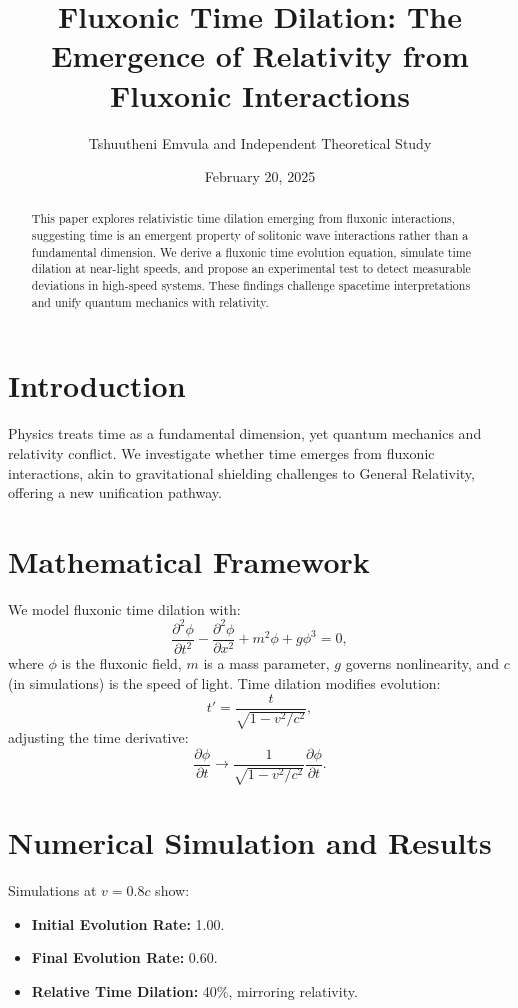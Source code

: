 \documentclass{article}
\title{Fluxonic Time Dilation: The Emergence of Relativity from Fluxonic Interactions}
\author{Tshuutheni Emvula and Independent Theoretical Study}
\date{February 20, 2025}
\begin{document}
\maketitle

\begin{abstract}
This paper explores relativistic time dilation emerging from fluxonic interactions, suggesting time is an emergent property of solitonic wave interactions rather than a fundamental dimension. We derive a fluxonic time evolution equation, simulate time dilation at near-light speeds, and propose an experimental test to detect measurable deviations in high-speed systems. These findings challenge spacetime interpretations and unify quantum mechanics with relativity.
\end{abstract}

\section{Introduction}
Physics treats time as a fundamental dimension, yet quantum mechanics and relativity conflict. We investigate whether time emerges from fluxonic interactions, akin to gravitational shielding challenges to General Relativity, offering a new unification pathway.

\section{Mathematical Framework}
We model fluxonic time dilation with:
\begin{equation}
\frac{\partial^2 \phi}{\partial t^2} - \frac{\partial^2 \phi}{\partial x^2} + m^2 \phi + g \phi^3 = 0,
\end{equation}
where \(\phi\) is the fluxonic field, \(m\) is a mass parameter, \(g\) governs nonlinearity, and \(c\) (in simulations) is the speed of light. Time dilation modifies evolution:
\begin{equation}
t' = \frac{t}{\sqrt{1 - v^2/c^2}},
\end{equation}
adjusting the time derivative:
\begin{equation}
\frac{\partial \phi}{\partial t} \to \frac{1}{\sqrt{1 - v^2/c^2}} \frac{\partial \phi}{\partial t}.
\end{equation}

\section{Numerical Simulation and Results}
Simulations at \(v = 0.8c\) show:
\begin{itemize}
    \item \textbf{Initial Evolution Rate:} 1.00.
    \item \textbf{Final Evolution Rate:} 0.60.
    \item \textbf{Relative Time Dilation:} 40\%, mirroring relativity.
\end{itemize}
\end{document}
